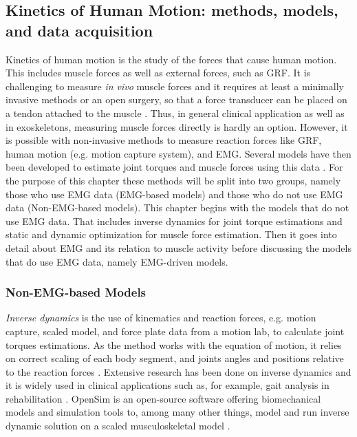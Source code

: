 \subsection{Kinetics of Human Motion: methods, models, and data acquisition}
\label{sec:A-MSModels}
Kinetics of human motion is the study of the forces that cause human motion. 
This includes muscle forces as well as external forces, such as \ac{GRF}.
It is challenging to measure \textit{in vivo} muscle forces and it requires at least a minimally invasive methods or an open surgery, so that a force transducer can be placed on a tendon attached to the muscle \cite{Erdemir2007}. 
Thus, in general clinical application as well as in exoskeletons, measuring muscle forces directly is hardly an option.
However, it is possible with non-invasive methods to measure reaction forces like \ac{GRF}, human motion (e.g. motion capture system), and \ac{EMG}.
Several models have then been developed to estimate joint torques and muscle forces using this data \cite{Erdemir2007}.
For the purpose of this chapter these methods will be split into two groups, namely those who use \ac{EMG} data (\ac{EMG}-based models) and those who do not use \ac{EMG} data (Non-\ac{EMG}-based models).
This chapter begins with the models that do not use \ac{EMG} data.
That includes inverse dynamics for joint torque estimations and static and dynamic optimization for muscle force estimation. 
Then it goes into detail about \ac{EMG} and its relation to muscle activity before discussing the models that do use \ac{EMG} data, namely \ac{EMG}-driven models.

\subsubsection{Non-\ac{EMG}-based Models}
\label{sec:A-NonEMGBasedModels}
\textit{Inverse dynamics} is the use of kinematics and reaction forces, e.g. motion capture, scaled model, and force plate data from a motion lab, to calculate joint torques estimations.
As the method works with the equation of motion, it relies on correct scaling of each body segment, and joints angles and positions relative to the reaction forces \cite{Buchanan2004,Erdemir2007}.
Extensive research has been done on inverse dynamics and it is widely used in clinical applications such as, for example, gait analysis in rehabilitation \cite{Erdemir2007,Buchanan2004,Pizzolato2015}.
OpenSim \cite{Delp2007, Seth2018} is an open-source software offering biomechanical models and simulation tools to, among many other things, model and run inverse dynamic solution on a scaled musculoskeletal model \cite{Buchanan2004, Delp2007, Seth2018, Pizzolato2017}.

